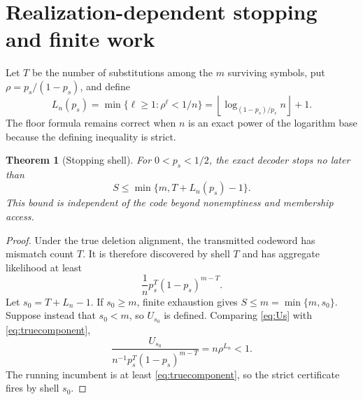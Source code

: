 \documentclass[11pt]{article}
\newtheorem{theorem}{Theorem}
\theoremstyle{remark}\newtheorem{remark}[theorem]{Remark}
\begin{document}
\section{Realization-dependent stopping and finite work}
Let $T$ be the number of substitutions among the $m$ surviving symbols, put
$\rho=p_s/(1-p_s)$, and define
\begin{equation}
 L_n(p_s)=\min\{\ell\ge1:\rho^\ell<1/n\}
 =\left\lfloor\log_{(1-p_s)/p_s}n\right\rfloor+1. \label{eq:Ln}
\end{equation}
The floor formula remains correct when $n$ is an exact power of the logarithm base because the
defining inequality is strict.

\begin{theorem}[Stopping shell]\label{thm:stop}
For $0<p_s<1/2$, the exact decoder stops no later than
\begin{equation}
 S\le\min\{m,T+L_n(p_s)-1\}. \label{eq:stop}
\end{equation}
This bound is independent of the code beyond nonemptiness and membership access.
\end{theorem}
\begin{proof}
Under the true deletion alignment, the transmitted codeword has mismatch count $T$. It is therefore
discovered by shell $T$ and has aggregate likelihood at least
\begin{equation}
 \frac1n p_s^T(1-p_s)^{m-T}. \label{eq:truecomponent}
\end{equation}
Let $s_0=T+L_n-1$. If $s_0\ge m$, finite exhaustion gives
$S\le m=\min\{m,s_0\}$. Suppose instead that $s_0<m$, so $U_{s_0}$ is defined. Comparing
\eqref{eq:Us} with \eqref{eq:truecomponent},
\[
 \frac{U_{s_0}}{n^{-1}p_s^T(1-p_s)^{m-T}}=n\rho^{L_n}<1.
\]
The running incumbent is at least \eqref{eq:truecomponent}, so the strict certificate fires by
shell $s_0$.
\end{proof}
\end{document}

